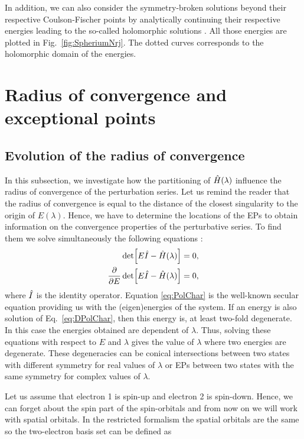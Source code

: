 \documentclass[11pt,a4paper]{article}
\newcommand{\hH}{\Hat{H}}
\newcommand{\hI}{\Hat{I}}
\begin{document}
In addition, we can also consider the symmetry-broken solutions beyond their respective Coulson-Fischer points by analytically continuing their respective energies leading to the so-called holomorphic solutions \cite{Hiscock_2014, Burton_2019, Burton_2019a}. All those energies are plotted in Fig.~\ref{fig:SpheriumNrj}. The dotted curves corresponds to the holomorphic domain of the energies.


\section{Radius of convergence and exceptional points}

\subsection{Evolution of the radius of convergence}

In this subsection, we investigate how the partitioning of $\hH(\lambda)$ influence the radius of convergence of the perturbation series. Let us remind the reader that the radius of convergence is equal to the distance of the closest singularity to the origin of $E(\lambda)$. Hence, we have to determine the locations of the EPs to obtain information on the convergence properties of the perturbative series. To find them we solve simultaneously the following equations \cite{Cejnar_2007}:
\begin{subequations}
\begin{align}
	\label{eq:PolChar}
	\det[E\hI-\hH(\lambda)] & = 0,
	\\ 
	\label{eq:DPolChar}
	\pdv{E}\det[E\hI-\hH(\lambda)] & = 0,
\end{align}
\end{subequations}
where $\hI$ is the identity operator.
Equation \eqref{eq:PolChar} is the well-known secular equation providing us with the (eigen)energies of the system. If an energy is also solution of Eq.~\eqref{eq:DPolChar}, then this energy is, at least two-fold degenerate. In this case the energies obtained are dependent of $\lambda$. Thus, solving these equations with respect to $E$ and $\lambda$ gives the value of $\lambda$ where two energies are degenerate. These degeneracies can be conical intersections between two states with different symmetry for real values of $\lambda$ \cite{Yarkony_1996} or EPs between two states with the same symmetry for complex values of $\lambda$.

Let us assume that electron 1 is spin-up and electron 2 is spin-down. 
Hence, we can forget about the spin part of the spin-orbitals and from now on we will work with spatial orbitals. In the restricted formalism the spatial orbitals are the same so the two-electron basis set can be defined as
\end{document}
